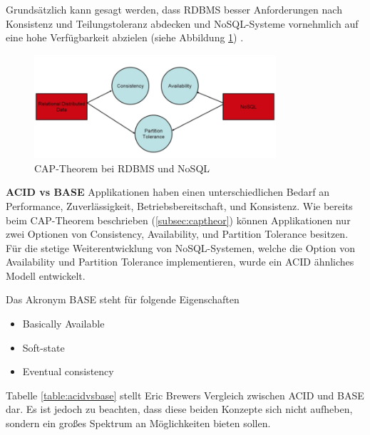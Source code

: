 Grundsätzlich kann gesagt werden, dass RDBMS besser Anforderungen nach Konsistenz und Teilungstoleranz abdecken und NoSQL-Systeme vornehmlich auf eine hohe Verfügbarkeit abzielen (siehe Abbildung \ref{fig:captheor}) \cite{MELD.CH2-noSQL.capTheoremComp}.

\begin{figure}[!htb]\centering
	\includegraphics[width=0.8\textwidth]{images/capTheorem}
	\caption{CAP-Theorem bei RDBMS und NoSQL \cite{MELD.CH2-noSQL.capTheoremComp}}
	\label{fig:captheor}
\end{figure}

\clearpage

\label{subsec:acidvsbase}
\textbf{ACID vs BASE\newline}
Applikationen haben einen unterschiedlichen Bedarf an Performance, Zuverlässigkeit, Betriebsbereitschaft, und Konsistenz. Wie bereits beim CAP-Theorem beschrieben (\ref{subsec:captheor}) können Applikationen nur zwei Optionen von Consistency, Availability, und Partition Tolerance besitzen. Für die stetige Weiterentwicklung von NoSQL-Systemen, welche die Option von Availability und Partition Tolerance implementieren, wurde ein ACID ähnliches Modell entwickelt.

Das Akronym BASE steht für folgende Eigenschaften
\begin{itemize}
	\item Basically Available
	\item Soft-state
	\item Eventual consistency
\end{itemize}

Tabelle \ref{table:acidvsbase} stellt Eric Brewers Vergleich zwischen ACID und BASE dar. Es ist jedoch zu beachten, dass diese beiden Konzepte sich nicht aufheben, sondern ein großes Spektrum an Möglichkeiten bieten sollen. 


